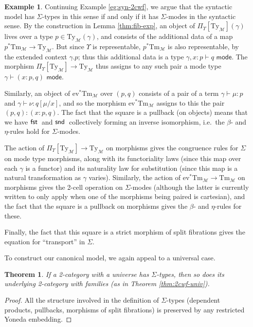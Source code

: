 \documentclass[10pt]{article}
\newtheorem{theorem}{Theorem}
\theoremstyle{definition}
\newtheorem{example}{Example}
\newcommand\dsd[1]{\ensuremath{\mathsf{#1}}}
\newcommand{\yields}{\vdash}
\newcommand{\type}{\,\,\mathsf{mode}}
\newcommand{\app}[2]{\ensuremath{#1 \: #2}}
\newcommand{\sigmacl}[3]{\ensuremath{(#1{:}#2,#3)}}
\newcommand{\fst}[1]{\app{\dsd{fst}}{#1}}
\newcommand{\snd}[1]{\app{\dsd{snd}}{#1}}
\newcommand\M{\mathcal{M}}
\newcommand\Mty{{\mathrm{Ty}_{\M}}}
\newcommand\Mtm{{\mathrm{Tm}_{\M}}}
\newcommand\Ups{\Upsilon}
\newcommand\ev{\mathrm{ev}}
\begin{document}
\begin{example}\label{eg:syn-sig}
  Continuing Example \ref{eg:syn-2cwf}, we argue that the syntactic model has $\Sigma$-types in this sense if and only if it has $\Sigma$-modes in the syntactic sense.
By the construction in Lemma \ref{thm:fib-exp}, an object of $\Pi_\Ups[\Mty](\gamma)$ lives over a type $p\in \Mty(\gamma)$, and consists of the additional data of a map $p^*\Mtm \to \Mty$.
But since $\Ups$ is representable, $p^* \Mtm$ is also representable, by the extended context $\gamma.p$; thus this additional data is a type $\gamma,x:p \yields q \type$.
The morphism $\Pi_\Ups[\Mty] \to \Mty$ thus assigns to any such pair a mode type $\gamma \yields \sigmacl{x}{p}{q} \type$.

Similarly, an object of $\ev^* \Mtm$ over $(p,q)$ consists of a pair of a term $\gamma \yields \mu : p$ and $\gamma \yields \nu : q[\mu/x]$, and so the morphism $\ev^* \Mtm$ assigns to this the pair $(p,q):\sigmacl{x}{p}{q}$.
The fact that the square is a pullback (on objects) means that we have $\fst$ and $\snd$ collectively forming an inverse isomorphism, i.e.\ the $\beta$- and $\eta$-rules hold for $\Sigma$-modes.

The action of $\Pi_\Ups[\Mty] \to \Mty$ on morphisms gives the congruence rules for $\Sigma$ on mode type morphisms, along with its functoriality laws (since this map over each $\gamma$ is a functor) and its naturality law for substitution (since this map is a natural transformation as $\gamma$ varies).
Similarly, the action of $\ev^* \Mtm \to \Mtm$ on morphisms gives the 2-cell operation on $\Sigma$-modes (although the latter is currently written to only apply when one of the morphisms being paired is cartesian), and the fact that the square is a pullback on morphisms gives the $\beta$- and $\eta$-rules for these.

Finally, the fact that this square is a strict morphism of split fibrations gives the equation for ``transport'' in $\Sigma$.
\end{example}

To construct our canonical model, we again appeal to a universal case.

\begin{theorem}\label{thm:sig-univ}
  If a 2-category with a universe has $\Sigma$-types, then so does its underlying 2-category with families (as in Theorem \ref{thm:2cwf-univ}).
\end{theorem}
\begin{proof}
  All the structure involved in the definition of $\Sigma$-types (dependent products, pullbacks, morphisms of split fibrations) is preserved by any restricted Yoneda embedding.
\end{proof}
\end{document}
